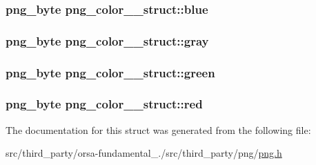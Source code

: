 \subsubsection[{blue}]{\setlength{\rightskip}{0pt plus 5cm}png\+\_\+byte png\+\_\+color\+\_\+\_\+struct\+::blue}\label{structpng__color__8__struct_a58225d3b6426185d5a40d3c9935db96a}
\hypertarget{structpng__color__8__struct_a574edc173d956cca144927262e88653e}{}
\subsubsection[{gray}]{\setlength{\rightskip}{0pt plus 5cm}png\+\_\+byte png\+\_\+color\+\_\+\_\+struct\+::gray}\label{structpng__color__8__struct_a574edc173d956cca144927262e88653e}
\hypertarget{structpng__color__8__struct_a40d053224177df35c037525b39563b05}{}
\subsubsection[{green}]{\setlength{\rightskip}{0pt plus 5cm}png\+\_\+byte png\+\_\+color\+\_\+\_\+struct\+::green}\label{structpng__color__8__struct_a40d053224177df35c037525b39563b05}
\hypertarget{structpng__color__8__struct_a5cd91bb4b3429256b84e6f28c72778b8}{}
\subsubsection[{red}]{\setlength{\rightskip}{0pt plus 5cm}png\+\_\+byte png\+\_\+color\+\_\+\_\+struct\+::red}\label{structpng__color__8__struct_a5cd91bb4b3429256b84e6f28c72778b8}


The documentation for this struct was generated from the following file\+:\begin{DoxyCompactItemize}
\item 
src/third\+\_\+party/orsa-\/fundamental\+\_./src/third\+\_\+party/png/\hyperlink{png_8h}{png.\+h}\end{DoxyCompactItemize}
